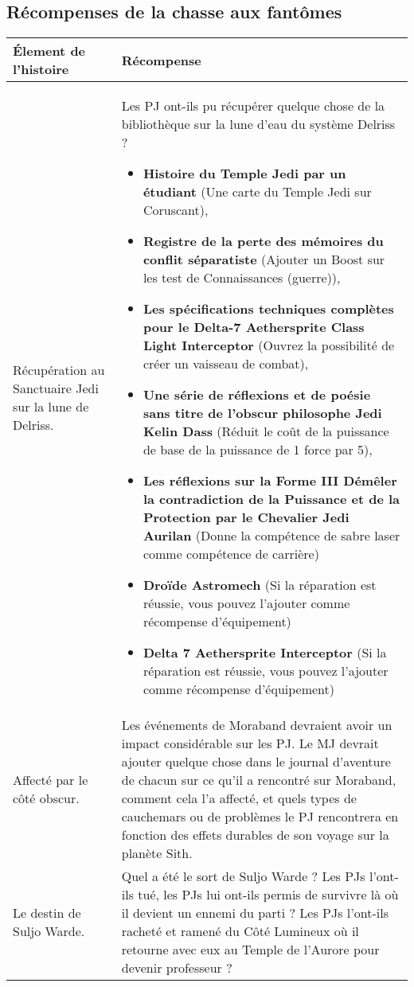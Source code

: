 \documentclass[twoside]{article}
\begin{document}
\subsection{Récompenses de la chasse aux fantômes}
\renewcommand{\arraystretch}{1.4}
\begin{tabular}{|p{4.5cm}|p{12cm}|}
	\hline 
	\cellcolor{DarkRed} {\large \textcolor{PureWhite}{\textbf{Élement de l'histoire}}} & \cellcolor{DarkRed} {\large \textcolor{PureWhite}{\textbf{Récompense}}} \\ 
	\hline 
	Récupération au Sanctuaire Jedi sur la lune de Delriss. & Les PJ ont-ils pu récupérer quelque chose de la bibliothèque sur la lune d'eau du système Delriss ? 
	\begin{itemize}
		\item \textbf{Histoire du Temple Jedi par un étudiant} (Une carte du Temple Jedi sur Coruscant),
		\item \textbf{Registre de la perte des mémoires du conflit séparatiste} (Ajouter un Boost sur les test de Connaissances (guerre)),
		\item \textbf{Les spécifications techniques complètes pour le Delta-7 Aethersprite Class Light Interceptor} (Ouvrez la possibilité de créer un vaisseau de combat),
		\item \textbf{Une série de réflexions et de poésie sans titre de l'obscur philosophe Jedi Kelin Dass} (Réduit le coût de la puissance de base de la puissance de 1 force par 5),
		\item \textbf{Les réflexions sur la Forme III Démêler la contradiction de la Puissance et de la Protection par le Chevalier Jedi Aurilan} (Donne la compétence de sabre laser comme compétence de carrière)
		\item \textbf{Droïde Astromech} (Si la réparation est réussie, vous pouvez l'ajouter comme récompense d'équipement)
		\item \textbf{Delta 7 Aethersprite Interceptor} (Si la réparation est réussie, vous pouvez l'ajouter comme récompense d'équipement)
	\end{itemize}
	\\ 
	\hline 
	Affecté par le côté obscur. & Les événements de Moraband devraient avoir un impact considérable sur les PJ. Le MJ devrait ajouter quelque chose dans le journal d'aventure de chacun sur ce qu'il a rencontré sur Moraband, comment cela l'a affecté, et quels types de cauchemars ou de problèmes le PJ rencontrera en fonction des effets durables de son voyage sur la planète Sith. \\ 
	\hline 
	Le destin de Suljo Warde. & Quel a été le sort de Suljo Warde ?  Les PJs l'ont-ils tué, les PJs lui ont-ils permis de survivre là où il devient un ennemi du parti ?  Les PJs l'ont-ils racheté et ramené du Côté Lumineux où il retourne avec eux au Temple de l'Aurore pour devenir professeur ? \\ 
	\hline 
\end{tabular} 
\end{document}
